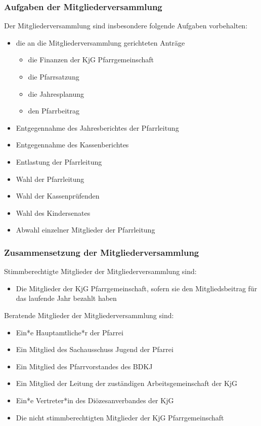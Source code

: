 \documentclass[12pt]{report}
\begin{document}
\begin{flushleft}
\subsubsection{Aufgaben der Mitgliederversammlung}
Der Mitgliederversammlung sind insbesondere folgende Aufgaben vorbehalten:
\begin{itemize}
  \item die an die Mitgliederversammlung gerichteten Anträge
    \begin{itemize}  
      \item die Finanzen der KjG Pfarrgemeinschaft
      \item die Pfarrsatzung
      \item die Jahresplanung
      \item den Pfarrbeitrag
    \end{itemize}
  \item Entgegennahme des Jahresberichtes der Pfarrleitung
  \item Entgegennahme des Kassenberichtes
  \item Entlastung der Pfarrleitung
  \item Wahl der Pfarrleitung
  \item Wahl der Kassenprüfenden
  \item Wahl des Kindersenates
  \item Abwahl einzelner Mitglieder der Pfarrleitung
\end{itemize}

\subsubsection{Zusammensetzung der Mitgliederversammlung}
Stimmberechtigte Mitglieder der Mitgliederversammlung sind:
\begin{itemize}
  \item Die Mitglieder der KjG Pfarrgemeinschaft, sofern sie den Mitgliedsbeitrag für das laufende Jahr bezahlt haben
\end{itemize}
Beratende Mitglieder der Mitgliederversammlung sind:
\begin{itemize}
  \item Ein*e Hauptamtliche*r der Pfarrei
  \item Ein Mitglied des Sachausschuss Jugend der Pfarrei
  \item Ein Mitglied des Pfarrvorstandes des BDKJ
  \item Ein Mitglied der Leitung der zuständigen Arbeitsgemeinschaft der KjG
  \item Ein*e Vertreter*in des Diözesanverbandes der KjG
  \item Die nicht stimmberechtigten Mitglieder der KjG Pfarrgemeinschaft
\end{itemize}

\end{flushleft}
\end{document}
